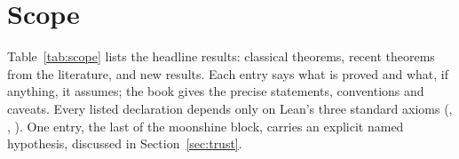\documentclass[10pt]{article}
\begin{document}
\section{Scope}\label{sec:scope}

Table~\ref{tab:scope} lists the headline results: classical theorems, recent theorems from the literature, and
new results. Each entry says what is proved and what, if anything, it assumes; the book gives the precise statements,
conventions and caveats. Every listed declaration depends only on Lean's three standard axioms (,
, ). One entry, the last of the moonshine block, carries an explicit named
hypothesis, discussed in Section~\ref{sec:trust}.
\end{document}
